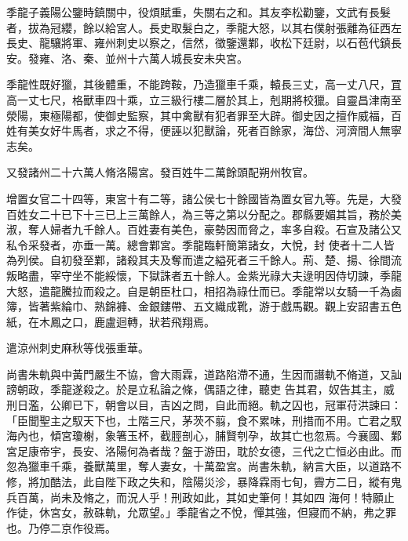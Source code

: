 \begin{pinyinscope}
 季龍子義陽公鑒時鎮關中，役煩賦重，失關右之和。其友李松勸鑒，文武有長髮者，拔為冠纓，餘以給宮人。長史取髮白之，季龍大怒，以其右僕射張離為征西左長史、龍驤將軍、雍州刺史以察之，信然，徵鑒還鄴，收松下廷尉，以石苞代鎮長安。發雍、洛、秦、並州十六萬人城長安未央宮。



 季龍性既好獵，其後體重，不能跨鞍，乃造獵車千乘，轅長三丈，高一丈八尺，罝高一丈七尺，格獸車四十乘，立三級行樓二層於其上，剋期將校獵。自靈昌津南至
 滎陽，東極陽都，使御史監察，其中禽獸有犯者罪至大辟。御史因之擅作威福，百姓有美女好牛馬者，求之不得，便誣以犯獸論，死者百餘家，海岱、河濟間人無寧志矣。



 又發諸州二十六萬人脩洛陽宮。發百姓牛二萬餘頭配朔州牧官。



 增置女官二十四等，東宮十有二等，諸公侯七十餘國皆為置女官九等。先是，大發百姓女二十已下十三已上三萬餘人，為三等之第以分配之。郡縣要媚其旨，務於美淑，奪人婦者九千餘人。百姓妻有美色，豪勢因而脅之，率多自殺。石宣及諸公又私令采發者，亦垂一萬。總會鄴宮。季龍臨軒簡第諸女，大悅，封
 使者十二人皆為列侯。自初發至鄴，諸殺其夫及奪而遣之縊死者三千餘人。荊、楚、揚、徐間流叛略盡，宰守坐不能綏懷，下獄誅者五十餘人。金紫光祿大夫逯明因侍切諫，季龍大怒，遣龍騰拉而殺之。自是朝臣杜口，相招為祿仕而已。季龍常以女騎一千為鹵簿，皆著紫綸巾、熟錦褲、金銀鏤帶、五文織成靴，游于戲馬觀。觀上安詔書五色紙，在木鳳之口，鹿盧迴轉，狀若飛翔焉。



 遣涼州刺史麻秋等伐張重華。



 尚書朱軌與中黃門嚴生不協，會大雨霖，道路陷滯不通，生因而譖軌不脩道，又訕謗朝政，季龍遂殺之。於是立私論之條，偶語之律，聽吏
 告其君，奴告其主，威刑日濫，公卿已下，朝會以目，吉凶之問，自此而絕。軌之囚也，冠軍苻洪諫曰：「臣聞聖主之馭天下也，土階三尺，茅茨不翦，食不累味，刑措而不用。亡君之馭海內也，傾宮瓊榭，象箸玉杯，截脛剖心，脯賢刳孕，故其亡也忽焉。今襄國、鄴宮足康帝宇，長安、洛陽何為者哉？盤于游田，耽於女德，三代之亡恒必由此。而忽為獵車千乘，養獸萬里，奪人妻女，十萬盈宮。尚書朱軌，納言大臣，以道路不修，將加酷法，此自陛下政之失和，陰陽災沴，暴降霖雨七旬，霽方二日，縱有鬼兵百萬，尚未及脩之，而況人乎！刑政如此，其如史筆何！其如四
 海何！特願止作徒，休宮女，赦硃軌，允眾望。」季龍省之不悅，憚其強，但寢而不納，弗之罪也。乃停二京作役焉。



\end{pinyinscope}